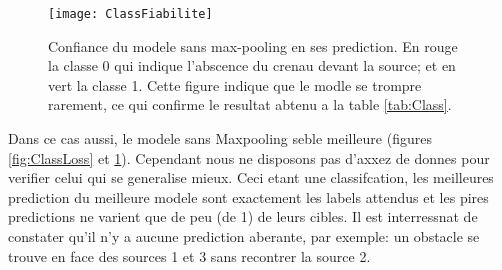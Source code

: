 \begin{figure}[H] 
\centering
\texttt{[image: ClassFiabilite]} 
\decoRule
\caption[ClassFiabilite]{Confiance du modele sans max-pooling en ses prediction. En rouge la classe 0 qui indique l'abscence du crenau devant la source; et en vert la classe 1. Cette figure indique que le modle se trompre rarement, ce qui confirme le resultat abtenu a la table \ref{tab:Class}.}
\label{fig:ClassFiabilite}
\end{figure}


Dans ce cas aussi, le modele sans Maxpooling seble meilleure (figures \ref{fig:ClassLoss} et \ref{fig:ClassFiabilite}). Cependant nous ne disposons pas d'axxez de donnes pour verifier celui qui se generalise mieux. Ceci etant une classifcation,  les meilleures prediction du meilleure modele sont exactement les labels attendus et les pires predictions ne varient que de peu (de 1) de leurs cibles. Il est interressnat de constater qu'il n'y a aucune prediction aberante, par exemple: un obstacle se trouve en face des sources 1 et 3 sans recontrer la source 2.

